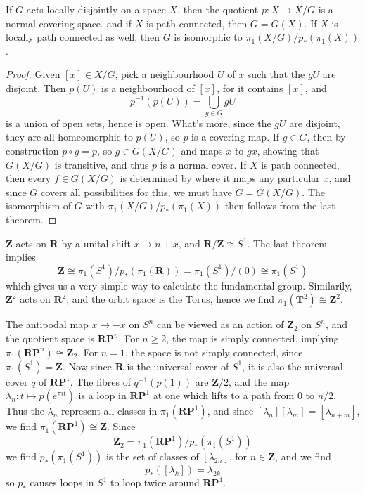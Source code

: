 \begin{theorem}
    If $G$ acts locally disjointly on a space $X$, then the quotient $p:X \to X/G$ is a normal covering space. and if $X$ is path connected, then $G = G(X)$. If $X$ is locally path connected as well, then $G$ is isomorphic to $\pi_1(X/G)/p_*(\pi_1(X))$.
\end{theorem}
\begin{proof}
    Given $[x] \in X/G$, pick a neighbourhood $U$ of $x$ such that the $gU$ are disjoint. Then $p(U)$ is a neighbourhood of $[x]$, for it contains $[x]$, and
    \[ p^{-1}(p(U)) = \bigcup_{g \in G} gU \]
    is a union of open sets, hence is open. What's more, since the $gU$ are disjoint, they are all homeomorphic to $p(U)$, so $p$ is a covering map. If $g \in G$, then by construction $p \circ g = p$, so $g \in G(X/G)$ and maps $x$ to $gx$, showing that $G(X/G)$ is transitive, and thus $p$ is a normal cover. If $X$ is path connected, then every $f \in G(X/G)$ is determined by where it maps any particular $x$, and since $G$ covers all possibilities for this, we must have $G = G(X/G)$. The isomorphism of $G$ with $\pi_1(X/G)/p_*(\pi_1(X))$ then follows from the last theorem.
\end{proof}

\begin{example}
    $\mathbf{Z}$ acts on $\mathbf{R}$ by a unital shift $x \mapsto n + x$, and $\mathbf{R}/\mathbf{Z} \cong S^1$. The last theorem implies
    \[ \mathbf{Z} \cong \pi_1(S^1)/p_*(\pi_1(\mathbf{R})) = \pi_1(S^1)/(0) \cong \pi_1(S^1) \]
    which gives us a very simple way to calculate the fundamental group. Similarily, $\mathbf{Z}^2$ acts on $\mathbf{R}^2$, and the orbit space is the Torus, hence we find $\pi_1(\mathbf{T}^2) \cong \mathbf{Z}^2$.
\end{example}

\begin{example}
    The antipodal map $x \mapsto -x$ on $S^n$ can be viewed as an action of $\mathbf{Z}_2$ on $S^n$, and the quotient space is $\mathbf{R} \mathbf{P}^n$. For $n \geq 2$, the map is simply connected, implying $\pi_1(\mathbf{R} \mathbf{P}^n) \cong \mathbf{Z}_2$. For $n = 1$, the space is not simply connected, since $\pi_1(S^1) = \mathbf{Z}$. Now since $\mathbf{R}$ is the universal cover of $S^1$, it is also the universal cover $q$ of $\mathbf{R} \mathbf{P}^1$. The fibres of $q^{-1}(p(1))$ are $\mathbf{Z}/2$, and the map $\lambda_n: t \mapsto p(e^{\pi i t})$ is a loop in $\mathbf{R} \mathbf{P}^1$ at one which lifts to a path from $0$ to $n/2$. Thus the $\lambda_n$ represent all classes in $\pi_1(\mathbf{R} \mathbf{P}^1)$, and since $[\lambda_n] [\lambda_m] = [\lambda_{n + m}]$, we find $\pi_1(\mathbf{R} \mathbf{P}^1) \cong \mathbf{Z}$. Since
    \[ \mathbf{Z}_2 = \pi_1(\mathbf{R} \mathbf{P}^1)/p_*(\pi_1(S^1)) \]
    we find $p_*(\pi_1(S^1))$ is the set of classes of $[\lambda_{2n}]$, for $n \in \mathbf{Z}$, and we find
    \[ p_*([\lambda_k]) = \lambda_{2k} \]
    so $p_*$ causes loops in $S^1$ to loop twice around $\mathbf{R} \mathbf{P}^1$.
\end{example}


